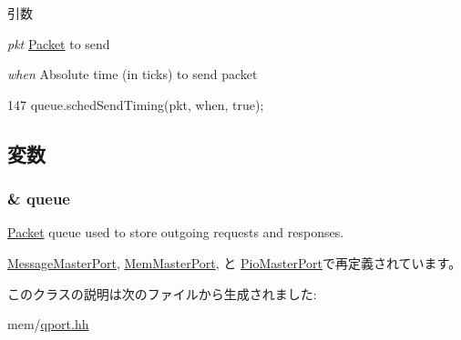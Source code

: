 \begin{DoxyParams}{引数}
\item[{\em pkt}]\hyperlink{classPacket}{Packet} to send \item[{\em when}]Absolute time (in ticks) to send packet \end{DoxyParams}



\begin{DoxyCode}
147     { queue.schedSendTiming(pkt, when, true); }
\end{DoxyCode}


\subsection{変数}
\hypertarget{classQueuedMasterPort_ae4e2ec83c21e5a331cecc31d84b2dbb7}{
\subsubsection[{queue}]{\& {\bf queue}}}
\label{classQueuedMasterPort_ae4e2ec83c21e5a331cecc31d84b2dbb7}
\hyperlink{classPacket}{Packet} queue used to store outgoing requests and responses. 

\hyperlink{classMessageMasterPort_aae3ed0c3ef8ff189915e74fe401279b5}{MessageMasterPort}, \hyperlink{classRubyPort_1_1MemMasterPort_aae3ed0c3ef8ff189915e74fe401279b5}{MemMasterPort}, と \hyperlink{classRubyPort_1_1PioMasterPort_aae3ed0c3ef8ff189915e74fe401279b5}{PioMasterPort}で再定義されています。

このクラスの説明は次のファイルから生成されました:\begin{DoxyCompactItemize}
\item 
mem/\hyperlink{qport_8hh}{qport.hh}\end{DoxyCompactItemize}
